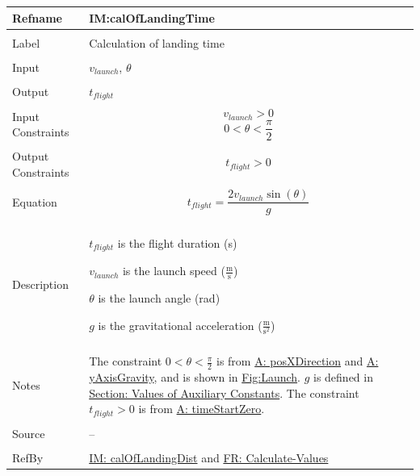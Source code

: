 \documentclass[12pt]{article}
\begin{document}
\noindent \begin{minipage}{\textwidth}
\begin{tabular}{p{} p{}}
\toprule \textbf{Refname} & \textbf{IM:calOfLandingTime}
\label{IM:calOfLandingTime}
\\ \midrule \\
Label & Calculation of landing time
\\ \midrule \\
Input & ${v_{launch}}$, $θ$
\\ \midrule \\
Output & ${t_{flight}}$
\\ \midrule \\
Input Constraints & \begin{displaymath}
                    {v_{launch}}>0
                    \end{displaymath}
                    \begin{displaymath}
                    0<θ<\frac{π}{2}
                    \end{displaymath}
\\ \midrule \\
Output Constraints & \begin{displaymath}
                     {t_{flight}}>0
                     \end{displaymath}
\\ \midrule \\
Equation & \begin{displaymath}
           {t_{flight}}=\frac{2 {v_{launch}} \sin\left(θ\right)}{g}
           \end{displaymath}
\\ \midrule \\
Description & \begin{symbDescription}
              \item{${t_{flight}}$ is the flight duration (s)}
              \item{${v_{launch}}$ is the launch speed ($\frac{\text{m}}{\text{s}}$)}
              \item{$θ$ is the launch angle (rad)}
              \item{$g$ is the gravitational acceleration ($\frac{\text{m}}{\text{s}^{2}}$)}
              \end{symbDescription}
\\ \midrule \\
Notes & The constraint $0<θ<\frac{π}{2}$ is from \hyperref[posXDirection]{A: posXDirection} and \hyperref[yAxisGravity]{A: yAxisGravity}, and is shown in \hyperref[Figure:Launch]{Fig:Launch}.
        $g$ is defined in \hyperref[Sec:AuxConstants]{Section: Values of Auxiliary Constants}.
        The constraint ${t_{flight}}>0$ is from \hyperref[timeStartZero]{A: timeStartZero}.
\\ \midrule \\
Source & --
\\ \midrule \\
RefBy & \hyperref[IM:calOfLandingDist]{IM: calOfLandingDist} and \hyperref[calcValues]{FR: Calculate-Values}
\\ \bottomrule \end{tabular}
\end{minipage}
\end{document}
